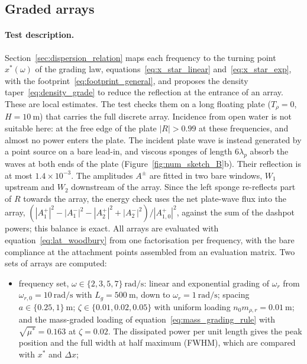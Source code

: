 {\subsection{Graded arrays}\label{subsec:num_graded}\label{subsubsec:num_L2_6}

\paragraph{Test description.} Section~\ref{sec:dispersion_relation} maps each frequency to the turning point $x^*(\omega)$ of the grading law, equations~\eqref{eq:x_star_linear} and~\eqref{eq:x_star_exp}, with the footprint~\eqref{eq:footprint_general}, and proposes the density taper~\eqref{eq:density_grade} to reduce the reflection at the entrance of an array. These are local estimates. The test checks them on a long floating plate ($T_\rho=0$, $H=10~\si{\meter}$) that carries the full discrete array. Incidence from open water is not suitable here: at the free edge of the plate $|R|>0.99$ at these frequencies, and almost no power enters the plate. The incident plate wave is instead generated by a point source on a bare lead-in, and viscous sponges of length $6\lambda_p$ absorb the waves at both ends of the plate (Figure~\ref{fig:num_sketch_B}b). Their reflection is at most $1.4\times10^{-3}$. The amplitudes $A^\pm$ are fitted in two bare windows, $W_1$ upstream and $W_2$ downstream of the array. Since the left sponge re-reflects part of $R$ towards the array, the energy check uses the net plate-wave flux into the array, $(|A^+_1|^2-|A^-_1|^2-|A^+_2|^2+|A^-_2|^2)/|A^+_{1,0}|^2$, against the sum of the dashpot powers; this balance is exact. All arrays are evaluated with equation~\eqref{eq:lat_woodbury} from one factorisation per frequency, with the bare compliance at the attachment points assembled from an evaluation matrix. Two sets of arrays are computed:
\begin{itemize}
    \item frequency set, $\omega\in\{2,3,5,7\}~\si{\radian\per\second}$: linear and exponential grading of $\omega_r$ from $\omega_{r,0}=10~\si{\radian\per\second}$ with $L_g=500~\si{\meter}$, down to $\omega_r=1~\si{\radian\per\second}$; spacing $a\in\{0.25,1\}~\si{\meter}$; $\zeta\in\{0.01,0.02,0.05\}$ with uniform loading $n_0m_{\rho,r}=0.01~\si{\meter}$; and the mass-graded loading of equation~\eqref{eq:mass_grading_rule} with $\sqrt{\mu^*}=0.163$ at $\zeta=0.02$. The dissipated power per unit length gives the peak position and the full width at half maximum (FWHM), which are compared with $x^*$ and $\Delta x$;

\end{itemize}}
